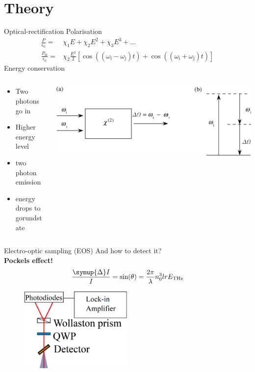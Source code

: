 \documentclass[aspectratio=1610, 9pt]{beamer}
\begin{document}
\section{Theory}
\begin{frame}{Optical-rectification}
 Polarisation
  \begin{align}
    \frac{P}{\epsilon_0} =& \chi_1E + \chi_2 E^2 + \chi_3 E^3 + ... \\
    \frac{P_\text{nl}}{\epsilon_0} =& \chi_2 \frac{E^2}{2} \left[ \cos((\omega_\text{i} - \omega_\text{j})t) + \cos((\omega_\text{i} + \omega_\text{j})t) \right ]
  \end{align}
  Energy conservation
  \begin{columns}
    \begin{column}{.4\textwidth}
      \begin{itemize}
        \item Two photons go in
        \item Higher energy level
        \item two photon emission 
        \item energy drops to gorundstate
      \end{itemize}
    \end{column}
    \begin{column}{.5\textwidth}
      \includegraphics[width=\textwidth]{images/diffrence_frequency_mixing.PNG}
    \end{column}
  \end{columns}
\end{frame}

\begin{frame}{Electro-optic sampling (EOS)}
  And how to detect it?\\
  \textbf{Pockels effect!}\cite{THZ_eltric_field}
  \begin{equation}
    \frac{\symup{\Delta}I}{I} = \text{sin}(\theta) = \frac{2\pi}{\lambda} n_0^3 l r E_\text{THz}
\end{equation}
\begin{figure}
  \centering
  \includegraphics[width=0.5\textwidth]{images/detectionunit.png}
\end{figure}
\end{frame}
\end{document}
